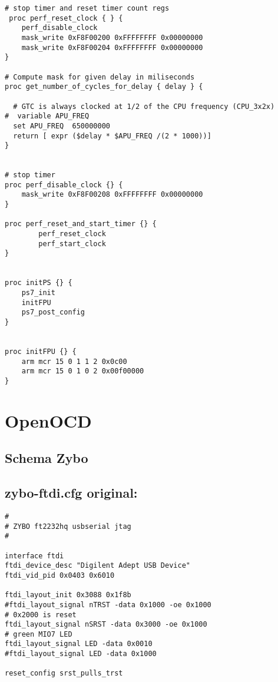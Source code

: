 \begin{lstlisting}
# stop timer and reset timer count regs 
 proc perf_reset_clock { } {
	perf_disable_clock
    mask_write 0xF8F00200 0xFFFFFFFF 0x00000000
    mask_write 0xF8F00204 0xFFFFFFFF 0x00000000
}

# Compute mask for given delay in miliseconds
proc get_number_of_cycles_for_delay { delay } {

  # GTC is always clocked at 1/2 of the CPU frequency (CPU_3x2x)
#  variable APU_FREQ
  set APU_FREQ  650000000
  return [ expr ($delay * $APU_FREQ /(2 * 1000))]
}


# stop timer 
proc perf_disable_clock {} {
    mask_write 0xF8F00208 0xFFFFFFFF 0x00000000 
}

proc perf_reset_and_start_timer {} {
  	    perf_reset_clock 
	    perf_start_clock 
}


proc initPS {} {
	ps7_init
    initFPU
	ps7_post_config
}


proc initFPU {} {
    arm mcr 15 0 1 1 2 0x0c00
    arm mcr 15 0 1 0 2 0x00f00000
}
\end{lstlisting}







\section{OpenOCD}

\subsection{Schema Zybo}
\label{anhang:schemaZybo}




\subsection{zybo-ftdi.cfg original:}
\label{anhang:zybo-ftdi-orig.cfg}
\lstset{language=tcl}
\begin{lstlisting}
#
# ZYBO ft2232hq usbserial jtag
#

interface ftdi
ftdi_device_desc "Digilent Adept USB Device"
ftdi_vid_pid 0x0403 0x6010

ftdi_layout_init 0x3088 0x1f8b
#ftdi_layout_signal nTRST -data 0x1000 -oe 0x1000
# 0x2000 is reset
ftdi_layout_signal nSRST -data 0x3000 -oe 0x1000
# green MIO7 LED
ftdi_layout_signal LED -data 0x0010
#ftdi_layout_signal LED -data 0x1000

reset_config srst_pulls_trst
\end{lstlisting}


